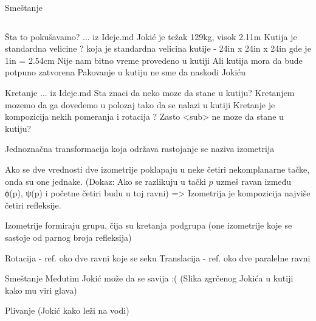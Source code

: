 \documentclass{beamer}
\begin{document}
\begin{frame}{Smeštanje}
\begin{columns}
\begin{column}{0.5\textwidth}
        \end{column}
        \end{columns}
    \end{frame}
    \begin{frame}{Šta to pokušavamo?}
        ... iz Ideje.md
        Jokić je težak 129kg, visok 2.11m
        Kutija je standardna velicine
          ? koja je standardna velicina kutije
          - 24in x 24in x 24in gde je 1in = 2.54cm
        Nije nam bitno vreme provedeno u kutiji
        Ali kutija mora da bude potpuno zatvorena
        Pakovanje u kutiju ne sme da naskodi Jokiću
    \end{frame}
    \begin{frame}{Kretanje}
        ... iz Ideje.md
        Sta znaci da neko moze da stane u kutiju?
        Kretanjem mozemo da ga dovedemo u polozaj
        tako da se nalazi u kutiji
        Kretanje je kompozicija nekih pomeranja i rotacija
        ? Zasto <sub> ne moze da stane u kutiju?
        
        Jednoznačna transformacija koja održava rastojanje
        se naziva izometrija

        Ako se dve vrednosti dve izometrije poklapaju u neke četiri
        nekomplanarne tačke, onda su one jednake.
        (Dokaz: Ako se razlikuju u tački $p$ uzmeš ravan između
        ϕ(p), ψ(p) i početne četiri budu u toj ravni)
        => Izometrija je kompozicija najviše četiri refleksije.

        Izometrije formiraju grupu, čija su kretanja podgrupa
        (one izometrije koje se sastoje od parnog broja refleksija)

        Rotacija - ref. oko dve ravni koje se seku
        Translacija - ref. oko dve paralelne ravni
    \end{frame}
    \begin{frame}{Smeštanje}
        Međutim Jokić može da se savija :(
        (Slika zgrčenog Jokića u kutiji kako mu viri glava)
    \end{frame}
    \begin{frame}{Plivanje}
        (Jokić kako leži na vodi)
    \end{frame}
\end{document}
